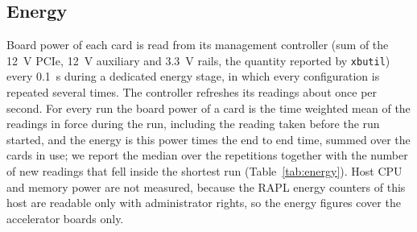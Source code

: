 \subsection{Energy}\label{subsec:method-energy}

Board power of each card is read from its management controller (sum of the 12~V PCIe, 12~V auxiliary and 3.3~V rails,
the quantity reported by \texttt{xbutil}) every 0.1~s during a dedicated energy stage, in which every configuration is
repeated several times. The controller refreshes its readings about once per second. For every run the board power of a
card is the time weighted mean of the readings in force during the run, including the reading taken before the run
started, and the energy is this power times the end to end time, summed over the cards in use; we report the median
over the repetitions together with the number of new readings that fell inside the shortest run (Table~\ref{tab:energy}).
Host CPU and memory power are not measured, because the RAPL energy counters of this host are readable only with
administrator rights, so the energy figures cover the accelerator boards only.
